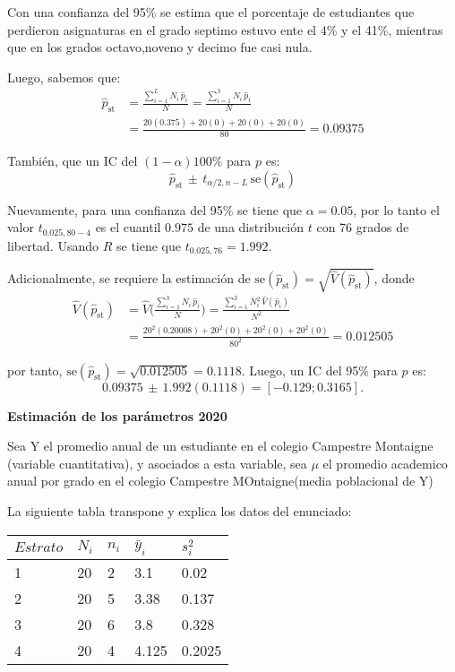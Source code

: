 \documentclass[
]{article}
\begin{document}
Con una confianza del 95\% se estima que el porcentaje de estudiantes
que perdieron asignaturas en el grado septimo estuvo ente el 4\% y el
41\%, mientras que en los grados octavo,noveno y decimo fue casi nula.

Luego, sabemos que: \[
        \begin{aligned}
        \widehat{p}_\text{st} &= \frac{\sum_{i = 1}^L N_i\,\widehat{p}_i}{N} = \frac{\sum_{i = 1}^3 N_i\,\widehat{p}_i}{N}\\[0.2cm]
        &= \frac{20(0.375) + 20(0) + 20(0) + 20(0)}{80} = 0.09375
        \end{aligned}
        \]

También, que un IC del \((1 - \alpha)100\%\) para \(p\) es:
\[\widehat{p}_\text{st} \,\pm\, t_{\alpha/2, n - L}\, \text{se}(\widehat{p}_\text{st})\]

Nuevamente, para una confianza del 95\% se tiene que \(\alpha = 0.05\),
por lo tanto el valor \(t_{0.025, 80 - 4}\) es el cuantil \(0.975\) de
una distribución \(t\) con 76 grados de libertad. Usando \(R\) se tiene
que \(t_{0.025, 76} = 1.992\).

Adicionalmente, se requiere la estimación de
\(\text{se}(\widehat{p}_\text{st}) = \sqrt{\widehat{V}(\widehat{p}_\text{st})}\),
donde \[
        \begin{aligned}
        \widehat{V}(\widehat{p}_\text{st}) &= \widehat{V}\Big(\frac{\sum_{i = 1}^3 N_i\,\widehat{p}_i}{N}\Big) = \frac{\sum_{i = 1}^3 N_i^2\,\widehat{V}(\widehat{p}_i)}{N^2}\\[0.2cm]
        &= \frac{20^2( 0.20008) + 20^2(0) + 20^2(0) + 20^2(0)}{80^2} = 0.012505
        \end{aligned}
        \]

por tanto,
\(\text{se}(\widehat{p}_\text{st}) = \sqrt{0.012505} = 0.1118\). Luego,
un IC del 95\% para \(p\) es:
\[0.09375\,\pm\,  1.992(0.1118) = [-0.129; 0.3165].\]

\newpage
\begin{center}
\textbf{Estimación de los parámetros 2020}
\end{center}

Sea Y el promedio anual de un estudiante en el colegio Campestre
Montaigne (variable cuantitativa), y asociados a esta variable, sea
\(\mu\) el promedio academico anual por grado en el colegio Campestre
MOntaigne(media poblacional de Y)

La siguiente tabla transpone y explica los datos del enunciado:

\begin{longtable}[]{@{}lllll@{}}
\toprule
\(Estrato\) & \(N_i\) & \(n_i\) & \(\bar{y}_i\) &
\(s_i^2\)\tabularnewline
\midrule
\endhead
1 & 20 & 2 & 3.1 & 0.02\tabularnewline
2 & 20 & 5 & 3.38 & 0.137\tabularnewline
3 & 20 & 6 & 3.8 & 0.328\tabularnewline
4 & 20 & 4 & 4.125 & 0.2025\tabularnewline
\bottomrule
\end{longtable}
\end{document}

